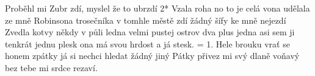 \cho{}
Proběhl mi Zubr zdí, myslel že to ubrzdí 2*
\ve{}
Vzala roha no to je celá vona
udělala ze mně Robinsona
trosečníka v tomhle městě zdí
žádný šífy ke mně nejezdí 
\ve{}
Zvedla kotvy někdy v půli ledna 
velmi pustej ostrov dva plus jedna
asi sem ji tenkrát jednu plesk
ona má svou hrdost a já stesk.
\cho{}
\ve{}
= 1.
\ve{}
Hele brouku vrať se honem zpátky
já si nechci hledat žádný jiný Pátky
přivez mi svý dlaně voňavý
bez tebe mi srdce rezaví.
\cho{}
\esong{}